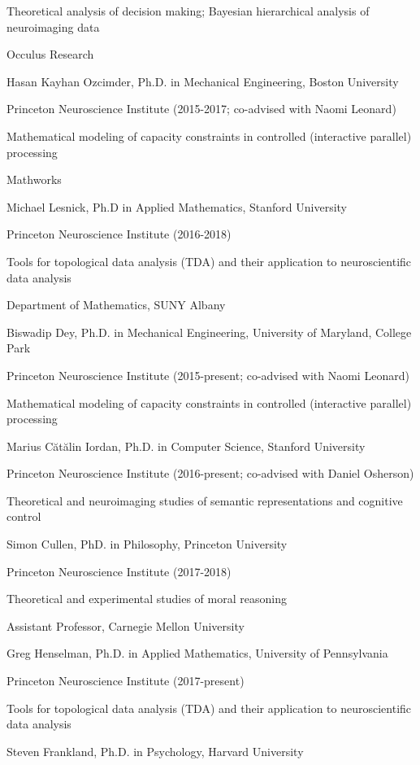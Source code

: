 \documentclass[10 pt]{article}
\begin{document}
Theoretical analysis of decision making; Bayesian hierarchical analysis of neuroimaging data

Occulus Research
    \medskip

Hasan Kayhan Ozcimder, Ph.D. in Mechanical Engineering, Boston University

Princeton Neuroscience Institute (2015-2017; co-advised with Naomi Leonard)

Mathematical modeling of capacity constraints in controlled (interactive parallel) processing

Mathworks
    \medskip

Michael Lesnick, Ph.D in Applied Mathematics, Stanford University

Princeton Neuroscience Institute (2016-2018)

Tools for topological data analysis (TDA) and their application to neuroscientific data analysis

Department of Mathematics, SUNY Albany
    \medskip

Biswadip Dey, Ph.D. in Mechanical Engineering, University of Maryland, College Park

Princeton Neuroscience Institute (2015-present; co-advised with Naomi Leonard)

Mathematical modeling of capacity constraints in controlled (interactive parallel) processing
    \medskip

Marius Cătălin Iordan, Ph.D. in Computer Science, Stanford University

Princeton Neuroscience Institute (2016-present; co-advised with Daniel Osherson)

Theoretical and neuroimaging studies of semantic representations and cognitive control
    \medskip

Simon Cullen, PhD. in Philosophy, Princeton University

Princeton Neuroscience Institute (2017-2018)

Theoretical and experimental studies of moral reasoning

Assistant Professor, Carnegie Mellon University
    \medskip

Greg Henselman, Ph.D. in Applied Mathematics, University of Pennsylvania

Princeton Neuroscience Institute (2017-present)

Tools for topological data analysis (TDA) and their application to neuroscientific data analysis
    \medskip

Steven Frankland, Ph.D. in Psychology, Harvard University
\end{document}

